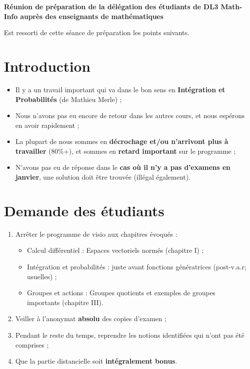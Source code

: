 \documentclass{article}
\begin{document}
  \begin{center}
    \vspace{2em}
    {\huge\textbf{Réunion de préparation de la délégation des étudiants de DL3 Math-Info auprès des enseignants de mathématiques}}
    \vspace{1em}
  \end{center}

Est ressorti de cette séance de préparation les points suivants.

\section{Introduction}

\begin{itemize}
    \item Il y a un travail important qui va dans le bon sens en \textbf{Intégration et Probabilités} (de Mathieu Merle) ;
    \item Nous n'avons pas eu encore de retour dans les autres cours, et nous espérons en avoir rapidement ;
    \item La plupart de nous sommes en \textbf{décrochage et/ou n'arrivont plus à travailler} (80\%+), et sommes en \textbf{retard important} sur le programme ;  
    \item N'avons pas eu de réponse dans le \textbf{cas où il n'y a pas d'examens en janvier}, une solution doit être trouvée (illégal également).
\end{itemize}

\section{Demande des étudiants}

\begin{enumerate}
    \item Arrêter le programme de visio aux chapitres évoqués :
    \begin{itemize}
        \item Calcul différentiel : Espaces vectoriels normés (chapitre I) ;
        \item Intégration et probabilités : juste avant fonctions génératrices (post-v.a.r; usuelles) ;
        \item Groupes et actions : Groupes quotients et exemples de groupes importants (chapitre III).
    \end{itemize}
    \item Veiller à l'anonymat \textbf{absolu} des copies d'examen ;
    \item Pendant le reste du temps, reprendre les notions identifiées qui n'ont pas été comprises ;
    \item Que la partie distancielle soit \textbf{intégralement bonus}.
\end{enumerate}
\end{document}
